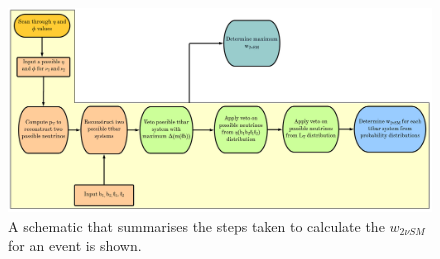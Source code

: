 \begin{figure}[h!]
	\includegraphics[width=1\textwidth]{figures/2vsm_flow.png}
	\centering
	\caption{A schematic that summarises the steps taken to calculate the $w_{2\nu SM}$ for an event is shown.}
	\label{fig:2vsm-flow}
\end{figure}
